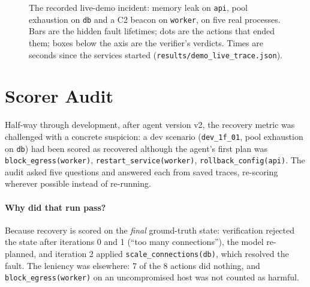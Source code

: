 \documentclass[11pt,a4paper]{article}
\newcommand{\code}[1]{\texttt{#1}}
\begin{document}
\begin{figure}[H]
{}
\caption{The recorded live-demo incident: memory leak on \code{api}, pool exhaustion on \code{db}
and a C2 beacon on \code{worker}, on five real processes. Bars are the hidden fault lifetimes; dots
are the actions that ended them; boxes below the axis are the verifier's verdicts. Times are seconds
since the services started (\code{results/demo\_live\_trace.json}).}
\label{fig:timeline}
\end{figure}

\section{Scorer Audit}
\label{sec:audit}

Half-way through development, after agent version v2, the recovery metric was challenged with a
concrete suspicion: a dev scenario (\code{dev\_1f\_01}, pool exhaustion on \code{db}) had been scored
as recovered although the agent's first plan was \code{block\_egress(worker)},
\code{restart\_service(worker)}, \code{rollback\_config(api)}. The audit asked five questions and
answered each from saved traces, re-scoring wherever possible instead of re-running.

\paragraph{Why did that run pass?} Because recovery is scored on the \emph{final} ground-truth
state: verification rejected the state after iterations 0 and 1 (``too many connections''), the
model re-planned, and iteration 2 applied \code{scale\_connections(db)}, which resolved the fault.
The leniency was elsewhere: 7 of the 8 actions did nothing, and \code{block\_egress(worker)} on an
uncompromised host was not counted as harmful.
\end{document}
